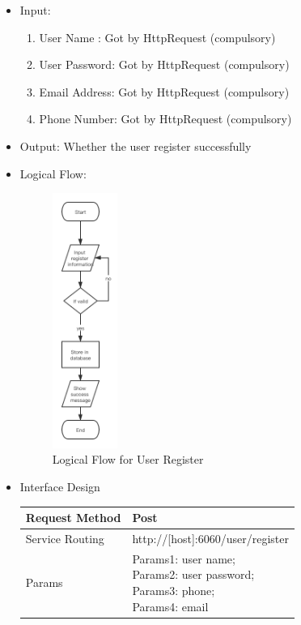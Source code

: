 \documentclass[16pt]{scrreprt}
\begin{document}
\begin{itemize}
	\item Input: \\
	\begin{enumerate}
		\item User Name : Got by HttpRequest (compulsory)
		\item User Password: Got by HttpRequest (compulsory)
		\item Email Address: Got by HttpRequest (compulsory)
		\item Phone Number: Got by HttpRequest (compulsory)
	\end{enumerate}
	\item Output: Whether the user register successfully
	\item Logical Flow:
	 \begin{figure}[H]
	\centering
	\includegraphics[width=0.2\textwidth]{diagrams/register.png}
	\caption{Logical Flow for User Register}
\end{figure}
	\item Interface Design
	\begin{center}
    \begin{tabular}{p{5cm}p{10cm}}
        \hline
	    Request Method & Post\\
        \hline
	    Service Routing &  http://[host]:6060/user/register\\
        \hline
	    Params & \makecell[l]{Params1: user name;\\ Params2: user password;\\ Params3: phone;\\Params4: email}\\ 

\end{tabular}
\end{center}
\end{itemize}
\end{document}
